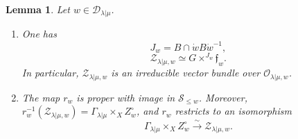 \documentclass[11pt,a4paper]{amsart}
\newtheorem{lemma}[theorem]{Lemma}
\theoremstyle{definition}
\theoremstyle{remark}
\newcommand{\lm}{\lambda|\mu}
\numberwithin{equation}{section}
\begin{document}
\begin{lemma}\label{lem:open-refinement-projection}
Let $w\in\mathcal D_{\lm}$.
\begin{enumerate}
\item One has
\begin{equation}\label{eq:minimal-stabilizers}
J_w=B\cap\dot wB\dot w^{-1},
\end{equation}
\begin{equation}\label{eq:minimal-fibers}
\mathscr Z_{\lm,w}\simeq G\times^{J_w}\mathfrak f_w .
\end{equation}
In particular, $\mathscr Z_{\lm,w}$ is an irreducible vector bundle over
$\mathcal O_{\lm,w}$.
\item The map $r_w$ is proper with image in $\mathscr S_{\le w}$.
Moreover,
$r_w^{-1}(\mathscr Z_{\lm,w})=\Gamma_{\lm}\times_XZ_w^\circ$, and $r_w$
restricts to an isomorphism
\begin{equation}\label{eq:open-refinement-isomorphism}
\Gamma_{\lm}\times_XZ_w^\circ\xrightarrow{\sim}\mathscr Z_{\lm,w}.
\end{equation}
\end{enumerate}
\end{lemma}
\end{document}
